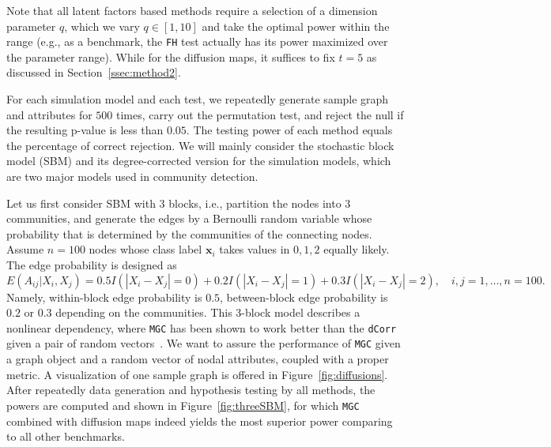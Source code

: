 \documentclass[11pt]{article}
\theoremstyle{definition}
\begin{document}
Note that all latent factors based methods require a selection of a dimension parameter $q$, which we vary $q \in [1,10]$ and take the optimal power within the range (e.g., as a benchmark, the \texttt{FH} test actually has its power maximized over the parameter range). While for the diffusion maps, it suffices to fix $t=5$ as discussed in Section~\ref{ssec:method2}.

For each simulation model and each test, we repeatedly generate sample graph and attributes for $500$ times, carry out the permutation test, and reject the null if the resulting p-value is less than $0.05$. The testing power of each method equals the percentage of correct rejection. We will mainly consider the stochastic block model (SBM) and its degree-corrected version for the simulation models, which are two major models used in community detection. 

Let us first consider SBM with $3$ blocks, i.e., partition the nodes into $3$ communities, and generate the edges by a Bernoulli random variable whose probability that is determined by the communities of the connecting nodes. Assume $n=100$ nodes whose class label $\mathbf{x}_i$ takes values in $0,1,2$ equally likely. The edge probability is designed as
\begin{equation}
\label{eq:Three}
E(A_{ij} | X_{i}, X_{j}) = 0.5 I(|X_{i} - X_{j}| = 0) + 0.2 I(|X_{i} - X_{j}| = 1) + 0.3 I(|X_{i} - X_{j}| = 2), \quad i,j = 1, \ldots, n = 100.
\end{equation} 
Namely, within-block edge probability is $0.5$, between-block edge probability is $0.2$ or $0.3$ depending on the communities. This 3-block model describes a nonlinear dependency, where \texttt{MGC} has been shown to work better than the \texttt{dCorr} given a pair of random vectors~\cite{shen2016discovering}. We want to assure the performance of \texttt{MGC} given a graph object and a random vector of nodal attributes, coupled with a proper metric. A visualization of one sample graph is offered in Figure~\ref{fig:diffusions}. After repeatedly data generation and hypothesis testing by all methods, the powers are computed and shown in Figure~\ref{fig:threeSBM}, for which \texttt{MGC} combined with diffusion maps indeed yields the most superior power comparing to all other benchmarks.
\end{document}
